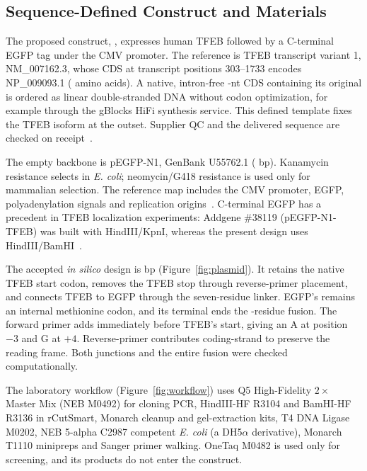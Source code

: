 \subsection{Sequence-Defined Construct and Materials}
The proposed construct, \ConstructName{}, expresses human TFEB followed by a C-terminal EGFP tag under the CMV promoter. The reference is TFEB transcript variant 1, NM\_007162.3, whose CDS at transcript positions 303--1733 encodes NP\_009093.1 (\TFEBAa{} amino acids). A native, intron-free \TFEBReferenceNt{}-nt CDS containing its original  is ordered as linear double-stranded DNA without codon optimization, for example through the gBlocks HiFi synthesis service. This defined template fixes the TFEB isoform at the outset. Supplier QC and the delivered sequence are checked on receipt~\cite{TFEBRef,IDTTemplate}.

The empty backbone is pEGFP-N1, GenBank U55762.1 (\EmptyVectorBp{} bp). Kanamycin resistance selects in \textit{E. coli}; neomycin/G418 resistance is used only for mammalian selection. The reference map includes the CMV promoter, EGFP, polyadenylation signals and replication origins~\cite{VectorRef,VectorManual}. C-terminal EGFP has a precedent in TFEB localization experiments: Addgene \#38119 (pEGFP-N1-TFEB) was built with HindIII/KpnI, whereas the present design uses HindIII/BamHI~\cite{RoczniakFerguson2012,Addgene38119}.

The accepted \textit{in silico} design is \ConstructBp{} bp (Figure~\ref{fig:plasmid}). It retains the native TFEB start codon, removes the TFEB stop through reverse-primer placement, and connects TFEB to EGFP through the seven-residue \oligo{\LinkerPeptide{}} linker. EGFP's  remains an internal methionine codon, and its terminal  ends the \FusionAa{}-residue fusion. The forward primer adds  immediately before TFEB's start, giving an A at position $-3$ and G at $+4$. Reverse-primer  contributes coding-strand  to preserve the reading frame. Both junctions and the entire fusion were checked computationally.

The laboratory workflow (Figure~\ref{fig:workflow}) uses Q5 High-Fidelity $2\times$ Master Mix (NEB M0492) for cloning PCR, HindIII-HF R3104 and BamHI-HF R3136 in rCutSmart, Monarch cleanup and gel-extraction kits, T4 DNA Ligase M0202, NEB 5-alpha C2987 competent \textit{E. coli} (a DH5$\alpha$ derivative), Monarch T1110 minipreps and Sanger primer walking. OneTaq M0482 is used only for screening, and its products do not enter the construct.

